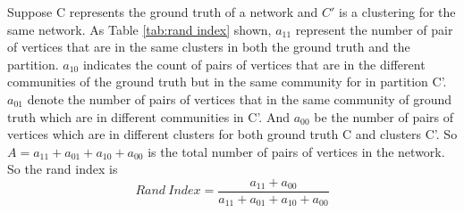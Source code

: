 \documentclass[12pt,oneside,final]{vlsithesis}
\begin{document}
Suppose C represents the ground truth of a network and $C'$ is a clustering for the same network.  As Table \ref{tab:rand index} shown, $a_{11}$ represent the number of pair of vertices that are in the same clusters in both the ground truth and the partition. $a_{10}$ indicates the count of pairs of vertices that are in the different communities of the ground truth but in the same community for in partition C'. $a_{01}$ denote the number of pairs of vertices that in the same community of ground truth which are in different communities in C'. And $a_{00}$ be the number of pairs of vertices which are in different clusters for both ground truth C and clusters C'. So $A = a_{11} + a_{01} + a_{10} + a_{00}$ is the total number of pairs of vertices in the network. So the rand index is 
\begin{equation}
Rand ~ Index = \frac{a_{11} + a_{00}}{a_{11} + a_{01} + a_{10} + a_{00}}
\end{equation}
\end{document}
